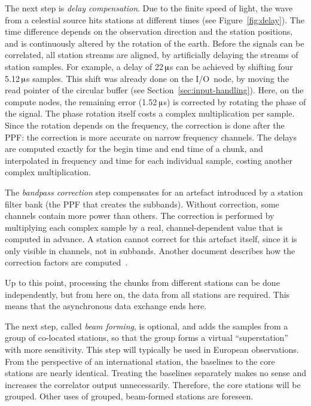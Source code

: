 \documentclass{sig-alternate}
\newcommand{\us}{\,$\muup$s\xspace}
\begin{document}
The next step is \emph{delay compensation}.
Due to the finite speed of light, the wave from a celestial source hits
stations at different times (see Figure~\ref{fig:delay}).
The time difference depends on the observation direction and the
station positions, and is continuously altered by the rotation of the earth.
Before the signals can be correlated, all station streams are aligned,
by artificially delaying the streams of station samples.
For example, a delay of 22\us can be achieved by shifting four 5.12\us
samples.
This shift was already done on the I/O~node, by moving the read pointer
of the circular buffer (see Section~\ref{sec:input-handling}).
Here, on the compute nodes, the remaining error (1.52\us) is corrected by
rotating the phase of the signal.
The phase rotation itself costs a complex multiplication per sample.
Since the rotation depends on the frequency, the correction is done after 
the PPF: the correction is more accurate on narrow frequency channels.
The delays are computed exactly for the begin time and end time of a chunk,
and interpolated in frequency and time for each individual sample, costing
another complex multiplication.

The \emph{bandpass correction} step compensates for an artefact
introduced by a station filter bank (the PPF that creates the subbands).
Without correction, some channels contain more power than others.
The correction is performed by multiplying each complex sample by a real,
channel-dependent value that is computed in advance.
A station cannot correct for this artefact itself, since it is only visible
in channels, not in subbands.
Another document describes how the correction factors are
computed~\cite{Romein:08}.

Up to this point, processing the chunks from different stations can be done
independently, but from here on, the data from all stations are required.
This means that the asynchronous data exchange ends here.

The next step, called \emph{beam forming}, is optional, and adds the samples
from a group of co-located stations, so that the group forms a virtual
``superstation'' with more sensitivity.
This step will typically be used in European observations.
From the perspective of an international station, the baselines to the core
stations are nearly identical.
Treating the baselines separately makes no sense and increases the correlator
output unnecessarily.
Therefore, the core stations will be grouped.
Other uses of grouped, beam-formed stations are foreseen.
\end{document}
